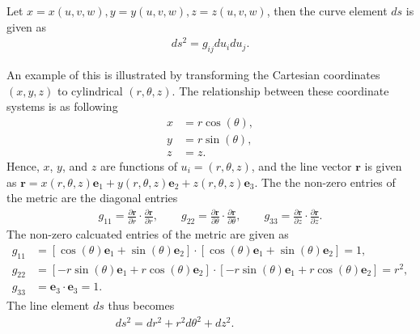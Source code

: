 \documentclass[main.tex]{subfiles}
\begin{document}
Let $x = x(u,v,w), y = y(u,v,w), z = z(u,v,w)$, then the curve element $ds$ is given as
\begin{align*}
ds^2 = g_{ij}du_idu_j.
\end{align*}

An example of this is illustrated by transforming the Cartesian coordinates $(x,y,z)$ to 
cylindrical $(r,\theta,z)$. The relationship between these coordinate systems is as following
\begin{align*}
x &= r\cos(\theta),\\
y &= r\sin(\theta),\\
z &= z. 
\end{align*}
Hence, $x$, $y$, and $z$ are functions of $u_i = (r,\theta,z)$, and the line vector $\mathbf{r}$ is given as
$\mathbf{r} = x(r,\theta,z)\mathbf{e}_1 + y(r,\theta,z)\mathbf{e}_2 + z(r,\theta,z)\mathbf{e}_3$.
The the non-zero entries of the metric are the diagonal entries
\begin{align*}
g_{11} = \frac{\partial \mathbf{r}}{\partial r} \cdot \frac{\partial \mathbf{r}}{\partial r},  \qquad
g_{22} =\frac{\partial \mathbf{r}}{\partial \theta} \cdot \frac{\partial \mathbf{r}}{\partial \theta}, \qquad
g_{33} = \frac{\partial \mathbf{r}}{\partial z} \cdot \frac{\partial \mathbf{r}}{\partial z}.
\end{align*}
The non-zero calcuated entries of the metric are given as
\begin{align*}
g_{11} &= \left[\cos(\theta)\mathbf{e}_1 + \sin(\theta)\mathbf{e}_2\right] \cdot  
	        \left[\cos(\theta)\mathbf{e}_1 + \sin(\theta)\mathbf{e}_2\right] = 1,\\
g_{22} &= \left[-r\sin(\theta)\mathbf{e}_1 + r\cos(\theta)\mathbf{e}_2\right] \cdot  
	        \left[-r\sin(\theta)\mathbf{e}_1 + r\cos(\theta)\mathbf{e}_2\right]  = r^2,\\
g_{33} &= \mathbf{e}_3 \cdot \mathbf{e}_3 = 1.
\end{align*}
The line element $ds$ thus becomes
\begin{align*}
ds^2 = dr^2 + r^2 d\theta^2 + dz^2. \qquad\qquad\qquad\phantom{.}
\end{align*}



\end{document}
